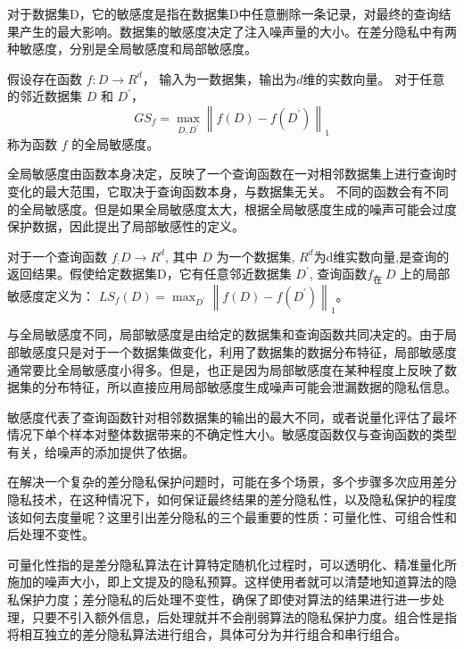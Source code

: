 对于数据集D，它的敏感度是指在数据集D中任意删除一条记录，对最终的查询结果产生的最大影响。数据集的敏感度决定了注入噪声量的大小。在差分隐私中有两种敏感度，分别是全局敏感度和局部敏感度。

\begin{define}[全局敏感度]\label{全局敏感度}
假设存在函数 $f: D \rightarrow R^{d}$， 输入为一数据集，输出为$d$维的实数向量。 对于任意的邻近数据集 $D$ 和 $D^{\prime}$，
$$
G S_{f}=\max _{D, D^{\prime}}\left\|f(D)-f\left(D^{\prime}\right)\right\|_{1}
$$
称为函数 $f$ 的全局敏感度。
\end{define}

全局敏感度由函数本身决定，反映了一个查询函数在一对相邻数据集上进行查询时变化的最大范围，它取决于查询函数本身，与数据集无关。
不同的函数会有不同的全局敏感度。但是如果全局敏感度太大，根据全局敏感度生成的噪声可能会过度保护数据，因此提出了局部敏感性的定义。

\begin{define}[局部敏感度]\label{局部敏感度}
对于一个查询函数 $f_{:} D \rightarrow R^{d}$, 其中 $D$ 为一个数据集, $R^{d}$为d维实数向量,是查询的返回结果。假使给定数据集D，它有任意邻近数据集 $D^{\prime}$, 查询函数$f_{\text {在 }} D$ 上的局部敏感度定义为：
$L S_{f}(D)=\max _{D^{\prime}}\left\|f(D)-f\left(D^{\prime}\right)\right\|_{1}$。
\end{define}

与全局敏感度不同，局部敏感度是由给定的数据集和查询函数共同决定的。由于局部敏感度只是对于一个数据集做变化，利用了数据集的数据分布特征，局部敏感度通常要比全局敏感度小得多。但是，也正是因为局部敏感度在某种程度上反映了数据集的分布特征，所以直接应用局部敏感度生成噪声可能会泄漏数据的隐私信息。

敏感度代表了查询函数针对相邻数据集的输出的最大不同，或者说量化评估了最坏情况下单个样本对整体数据带来的不确定性大小。敏感度函数仅与查询函数的类型有关，给噪声的添加提供了依据。

在解决一个复杂的差分隐私保护问题时，可能在多个场景，多个步骤多次应用差分隐私技术，在这种情况下，如何保证最终结果的差分隐私性，以及隐私保护的程度该如何去度量呢？这里引出差分隐私的三个最重要的性质：可量化性、可组合性和后处理不变性。

可量化性指的是差分隐私算法在计算特定随机化过程时，可以透明化、精准量化所施加的噪声大小，即上文提及的隐私预算。这样使用者就可以清楚地知道算法的隐私保护力度；差分隐私的后处理不变性，确保了即使对算法的结果进行进一步处理，只要不引入额外信息，后处理就并不会削弱算法的隐私保护力度。组合性是指将相互独立的差分隐私算法进行组合，具体可分为并行组合和串行组合。

